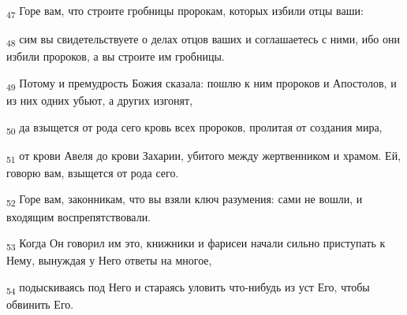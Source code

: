 \begin{tcolorbox}
\textsubscript{47} Горе вам, что строите гробницы пророкам, которых избили отцы ваши:
\end{tcolorbox}
\begin{tcolorbox}
\textsubscript{48} сим вы свидетельствуете о делах отцов ваших и соглашаетесь с ними, ибо они избили пророков, а вы строите им гробницы.
\end{tcolorbox}
\begin{tcolorbox}
\textsubscript{49} Потому и премудрость Божия сказала: пошлю к ним пророков и Апостолов, и из них одних убьют, а других изгонят,
\end{tcolorbox}
\begin{tcolorbox}
\textsubscript{50} да взыщется от рода сего кровь всех пророков, пролитая от создания мира,
\end{tcolorbox}
\begin{tcolorbox}
\textsubscript{51} от крови Авеля до крови Захарии, убитого между жертвенником и храмом. Ей, говорю вам, взыщется от рода сего.
\end{tcolorbox}
\begin{tcolorbox}
\textsubscript{52} Горе вам, законникам, что вы взяли ключ разумения: сами не вошли, и входящим воспрепятствовали.
\end{tcolorbox}
\begin{tcolorbox}
\textsubscript{53} Когда Он говорил им это, книжники и фарисеи начали сильно приступать к Нему, вынуждая у Него ответы на многое,
\end{tcolorbox}
\begin{tcolorbox}
\textsubscript{54} подыскиваясь под Него и стараясь уловить что-нибудь из уст Его, чтобы обвинить Его.
\end{tcolorbox}
